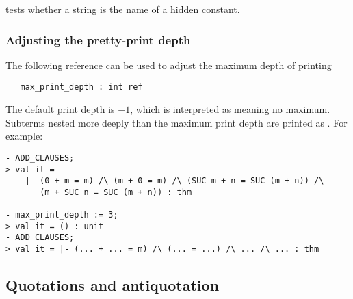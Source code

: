\noindent tests whether a string is the name of a hidden constant.

\subsubsection{Adjusting the pretty-print depth}
\label{sec:pretty-print-depth}

The following \ML{} reference can be used to adjust the maximum depth
of printing

\begin{holboxed}
\begin{verbatim}
   max_print_depth : int ref
\end{verbatim}
\end{holboxed}


\noindent The default print depth is $-1$, which is interpreted as
meaning no maximum.  Subterms nested more deeply than the maximum
print depth are printed as . For example:

\setcounter{sessioncount}{0}
\begin{session}
\begin{verbatim}
- ADD_CLAUSES;
> val it =
    |- (0 + m = m) /\ (m + 0 = m) /\ (SUC m + n = SUC (m + n)) /\
       (m + SUC n = SUC (m + n)) : thm

- max_print_depth := 3;
> val it = () : unit
- ADD_CLAUSES;
> val it = |- (... + ... = m) /\ (... = ...) /\ ... /\ ... : thm
\end{verbatim}
\end{session}

\subsection{Quotations and antiquotation}
\label{sec:quotation-antiquotation}

